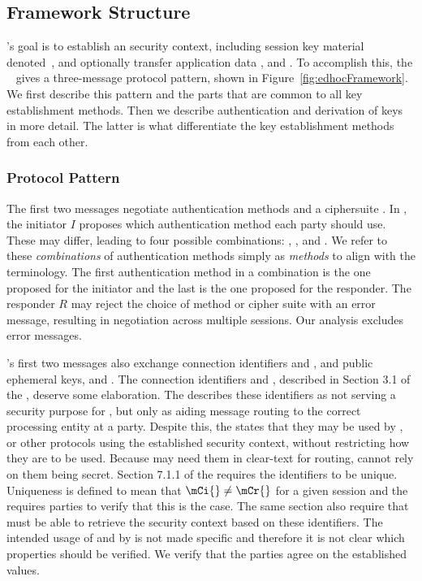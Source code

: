 \subsection{Framework Structure}
\label{sec:framework}
\mEdhoc{}'s goal is to establish an \mOscore{} security context,
including session key material \mbox{denoted \mSessKey{}}, and optionally transfer
application data \mADone{}, \mADtwo{} and \mADthree{}.
%
To accomplish this, the
\mSpec{}~\cite{our-analysis-selander-lake-edhoc-00} gives
a three-message protocol pattern, shown in Figure~\ref{fig:edhocFramework}.
%
We first describe this pattern and the parts that are common to all key
establishment methods.
%
Then we describe authentication and derivation of keys in more detail.
%
The latter is what differentiate the key establishment methods from each other.
%

\subsubsection{Protocol Pattern}
The first two messages negotiate authentication methods \mMethod{} and a
ciphersuite \mSuites{}.
%
In \mMethod{}, the initiator $I$ proposes which authentication method each
party should use.
%
These may differ, leading to four possible combinations:
\mSigSig{}, \mSigStat{}, \mStatSig{} and \mStatStat{}.
%
We refer to these \emph{combinations} of authentication methods simply as
\emph{methods} to align with the \mSpec{} terminology.
%
The first authentication method in a combination is the one proposed for the
initiator and the last is the one proposed for the responder.
%
The responder $R$ may reject the choice of method
or cipher suite with an error message, resulting in negotiation across
multiple \mEdhoc{} sessions.
%
Our analysis excludes error messages.
%

\mEdhoc{}'s first two messages also exchange connection identifiers \mCi{} and
\mCr{}, and public ephemeral keys, \mGx{} and \mGy{}.
%
The connection identifiers \mCi{} and \mCr{}, described in Section 3.1 of the
\mSpec{}, deserve some elaboration.
%
The \mSpec{} describes these identifiers as not serving a security purpose for
\mEdhoc{}, but only as aiding message routing to the correct \mEdhoc{} processing
entity at a party.
%
Despite this, the \mSpec{} states that they may be used by \mOscore{}, or other
protocols using the established security context, without restricting how they
are to be used.
%
Because \mEdhoc{} may need them in clear-text for routing, \mOscore{} cannot
rely on them being secret.
%
Section 7.1.1 of the \mSpec{} requires the identifiers to be unique.
%
Uniqueness is defined to mean that $\mCi{} \not = \mCr{}$ for a given session
and the \mSpec{} requires parties to verify that this is the case.
%
The same section also require that \mOscore{} must be able to retrieve the
security context based on these identifiers.
%
The intended usage of \mCi{} and \mCr{} by \mOscore{} is not made specific and
therefore it is not clear which properties should be verified.
%
We verify that the parties agree on the established values.
%

